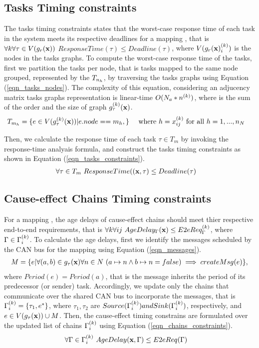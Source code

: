 \subsection{Tasks Timing constraints}
The tasks timing constraints states that the worst-case response time of each task in the system meets its respective deadlines for a mapping \ttx, that is $\forall k\forall \tau\in V(g_r(\textbf{x}))$ $ResponseTime(\tau)\leq Deadline(\tau)$, where $V(\sss{g_r(\x)})$ is the nodes in the tasks graphs. To compute the worst-case response time of the tasks, first we partition the tasks per node, that is tasks mapped to the same node grouped, represented by the $\ssb{T}[n_h]$, by traversing the tasks graphs using Equation (\ref{eqn_tasks_nodes}). The complexity of this equation, considering an adjucency matrix tasks graphs representation is linear-time $O(N_a*\ssp{n})$, where  is the sum of the order and the size of graph $\sss{g}[k][\tau](\x)$.
\begin{align}
\label{eqn_tasks_nodes}
T_{m_h}&=\{e\in V(\sss{g}[k][\tau](\x)) | e.node == m_h, \}& \mbox{ where }h=\xkij & \mbox{ for all } h=1,...,n_N
\end{align}

Then, we calculate the response time of each task $\tau \in T_{m}$ by invoking the response-time analyais formula, and construct the tasks timing constraints as shown in Equation (\ref{eqn_tasks_constraints}).
\begin{align}
\label{eqn_tasks_constraints}
\forall \tau\in T_{m} \ ResponseTime((\textbf{x},\tau)&\leq Deadline(\tau)
\end{align}

\subsection{Cause-effect Chains Timing constraints}
For a mapping \x, the age delays of cause-effect chains should meet thier respective end-to-end requirements, that is $\forall k\forall ij\ AgeDelay_\Gamma(\x)\leq \sss{E2eReq}[k][\Gamma]$, where $\Gamma\in \sss{\Gamma}$. To calculate the age delays, first we identify the messages scheduled by the CAN bus for the mapping \ttx using Equation (\ref{eqn_messages}). 
\begin{align}
\label{eqn_messages}
	M=\{e|\forall (a,b)\in g_\tau(\textbf{x})\forall n\in N\ (a\mapsto n \land b\mapsto n=false)\implies createMsg(e)\},
\end{align}
where $Period(e)=Period(a)$, that is the message inherits the period of its predecessor (or sender) task. Accordingly, we update only the chains that communicate over the shared CAN bus to incorporate the messages, that is $\sss{\Gamma}=\{\tau_1,e^*\}$, where $\tau_1,\tau_2$ are $Source(\sss{\Gamma}) and Sink(\sss{\Gamma})$, respectively, and $e\in V(g_\tau(\textbf{x}))\cup M$. Then, the cause-effect timing constrains are formulated over the updated list of chains $\sss{\Gamma}$ using Equation (\ref{eqn_chains_constraints}).
\begin{align}
\label{eqn_chains_constraints}
\forall \Gamma \in \sss{\Gamma} \ AgeDelay(\x,\Gamma)&\leq E2eReq(\Gamma)
\end{align}

